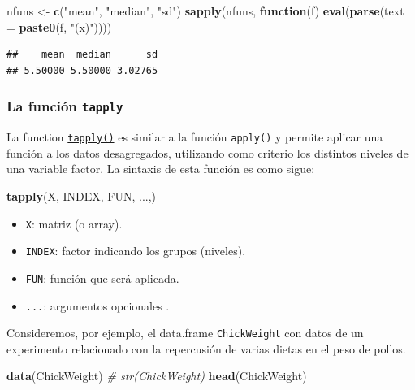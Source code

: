 \documentclass[]{book}
\newenvironment{Shaded}{\begin{snugshade}}{\end{snugshade}}
\newcommand{\KeywordTok}[1]{\textcolor[rgb]{0.13,0.29,0.53}{\textbf{#1}}}
\newcommand{\DataTypeTok}[1]{\textcolor[rgb]{0.13,0.29,0.53}{#1}}
\newcommand{\StringTok}[1]{\textcolor[rgb]{0.31,0.60,0.02}{#1}}
\newcommand{\CommentTok}[1]{\textcolor[rgb]{0.56,0.35,0.01}{\textit{#1}}}
\newcommand{\ControlFlowTok}[1]{\textcolor[rgb]{0.13,0.29,0.53}{\textbf{#1}}}
\newcommand{\NormalTok}[1]{#1}
\providecommand{\tightlist}{%
  \setlength{\itemsep}{0pt}\setlength{\parskip}{0pt}}
\begin{document}
\begin{Shaded}
\begin{Highlighting}[]
\NormalTok{nfuns <-}\StringTok{ }\KeywordTok{c}\NormalTok{(}\StringTok{"mean"}\NormalTok{, }\StringTok{"median"}\NormalTok{, }\StringTok{"sd"}\NormalTok{)}
\KeywordTok{sapply}\NormalTok{(nfuns, }\ControlFlowTok{function}\NormalTok{(f) }\KeywordTok{eval}\NormalTok{(}\KeywordTok{parse}\NormalTok{(}\DataTypeTok{text =} \KeywordTok{paste0}\NormalTok{(f, }\StringTok{"(x)"}\NormalTok{))))}
\end{Highlighting}
\end{Shaded}

\begin{verbatim}
##    mean  median      sd 
## 5.50000 5.50000 3.02765
\end{verbatim}

\subsubsection{\texorpdfstring{La función
\texttt{tapply}}{La función tapply}}\label{la-funciuxf3n-tapply}

La function
\href{https://www.rdocumentation.org/packages/base/versions/3.6.1/topics/tapply}{\texttt{tapply()}}
es similar a la función \texttt{apply()} y permite aplicar una función a
los datos desagregados, utilizando como criterio los distintos niveles
de una variable factor. La sintaxis de esta función es como sigue:

\begin{Shaded}
\begin{Highlighting}[]
    \KeywordTok{tapply}\NormalTok{(X, INDEX, FUN, ...,)}
\end{Highlighting}
\end{Shaded}

\begin{itemize}
\tightlist
\item
  \texttt{X}: matriz (o array).
\item
  \texttt{INDEX}: factor indicando los grupos (niveles).
\item
  \texttt{FUN}: función que será aplicada.
\item
  \texttt{...}: argumentos opcionales .
\end{itemize}

Consideremos, por ejemplo, el data.frame \texttt{ChickWeight} con datos
de un experimento relacionado con la repercusión de varias dietas en el
peso de pollos.

\begin{Shaded}
\begin{Highlighting}[]
\KeywordTok{data}\NormalTok{(ChickWeight)}
\CommentTok{# str(ChickWeight)}
\KeywordTok{head}\NormalTok{(ChickWeight)}
\end{Highlighting}
\end{Shaded}
\end{document}
